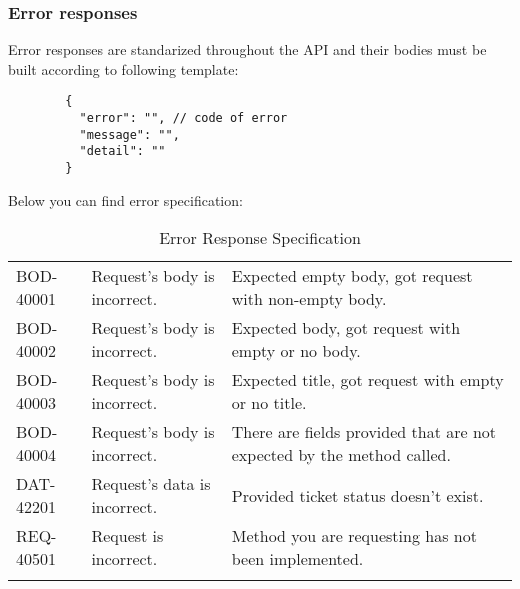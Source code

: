 \documentclass[a4paper]{article}
\begin{document}
    \subsubsection{Error responses}
    Error responses are standarized throughout the API and their bodies must be built according to following template:
    \begin{verbatim}
        {
          "error": "", // code of error
          "message": "",
          "detail": ""
        }
    \end{verbatim}
    Below you can find error specification:
    \begin{table}[htbp]
        \centering
        \caption{Error Response Specification}
        \begin{tabularx}{\linewidth}{|l|X|X|}
            \hline
            \centering{Error Code} & \centering{Message} & \centering{Detail} \tabularnewline \hline
            BOD-40001 & Request's body is incorrect. & Expected empty body, got request with non-empty body. \tabularnewline \hline
            BOD-40002 & Request's body is incorrect. & Expected body, got request with empty or no body. \tabularnewline \hline
            BOD-40003 & Request's body is incorrect. & Expected title, got request with empty or no title. \tabularnewline \hline
            BOD-40004 & Request's body is incorrect. & There are fields provided that are not expected by the method called. \tabularnewline \hline
            DAT-42201 & Request's data is incorrect. & Provided ticket status doesn't exist. \tabularnewline \hline
            REQ-40501 & Request is incorrect. & Method you are requesting has not been implemented. \tabularnewline \hline
            \hfill & \hfill & \hfill \tabularnewline \hline
        \end{tabularx}
    \end{table}
\end{document}
